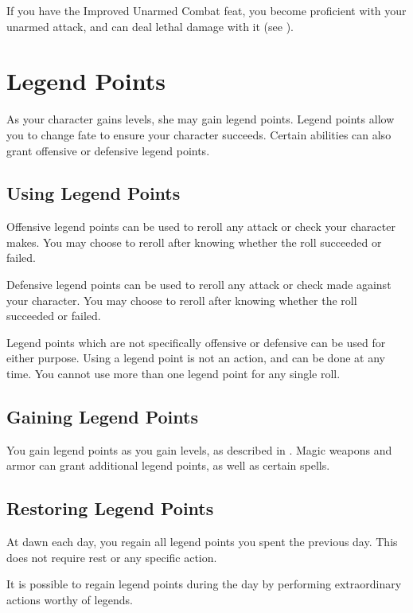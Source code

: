 If you have the Improved Unarmed Combat feat, you become proficient with your unarmed attack, and can deal lethal damage with it (see ).
\section{Legend Points}\label{Legend Points}

As your character gains levels, she may gain legend points.
Legend points allow you to change fate to ensure your character succeeds.
Certain abilities can also grant offensive or defensive legend points.

\subsection{Using Legend Points}

Offensive legend points can be used to reroll any attack or check your character makes.
You may choose to reroll after knowing whether the roll succeeded or failed.

Defensive legend points can be used to reroll any attack or check made against your character.
You may choose to reroll after knowing whether the roll succeeded or failed.

Legend points which are not specifically offensive or defensive can be used for either purpose.
Using a legend point is not an action, and can be done at any time.
You cannot use more than one legend point for any single roll.

\subsection{Gaining Legend Points}

You gain legend points as you gain levels, as described in .
Magic weapons and armor can grant additional legend points, as well as certain spells.

\subsection{Restoring Legend Points}

At dawn each day, you regain all legend points you spent the previous day.
This does not require rest or any specific action.

It is possible to regain legend points during the day by performing extraordinary actions worthy of legends.
